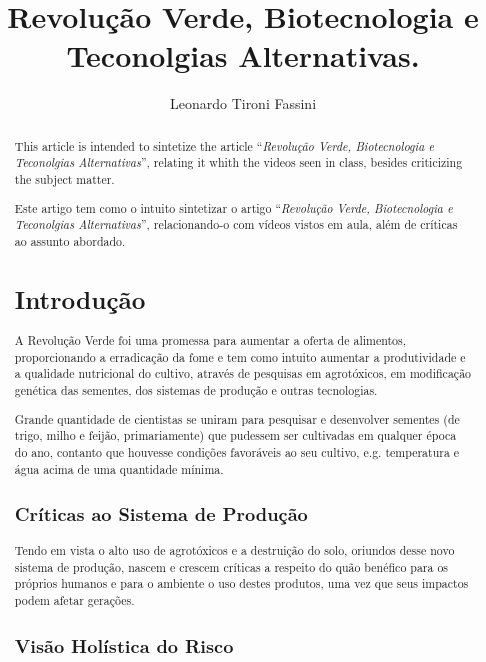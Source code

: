 \documentclass[12pt]{article}
\title{ Revolução Verde, Biotecnologia e Teconolgias Alternativas. }
\author{ Leonardo Tironi Fassini }
\begin{document}
\maketitle

\begin{abstract}
  This article is intended to sintetize the article ``\emph{Revolução Verde, Biotecnologia e Teconolgias Alternativas}''\cite{livro}, relating it whith the videos seen in class, besides criticizing the subject matter.

\begin{resumo}
  Este artigo tem como o intuito sintetizar o artigo ``\emph{Revolução Verde, Biotecnologia e Teconolgias Alternativas}''\cite{livro}, relacionando-o com vídeos vistos em aula, além de críticas ao assunto abordado.
\end{resumo}


\section{ Introdução }

A Revolução Verde foi uma promessa para aumentar a oferta de alimentos, proporcionando a erradicação da fome\cite{albergoni} e tem como intuito aumentar a produtividade e a qualidade nutricional do cultivo, através de pesquisas em agrotóxicos, em modificação genética das sementes, dos sistemas de produção e outras tecnologias\cite{livro}.

Grande quantidade de cientistas se uniram para pesquisar e desenvolver sementes (de trigo, milho e feijão, primariamente) que pudessem ser cultivadas em qualquer época do ano, contanto que houvesse condições favoráveis ao seu cultivo, e.g. temperatura e água acima de uma quantidade mínima.

\subsection{ Críticas ao Sistema de Produção }

Tendo em vista o alto uso de agrotóxicos e a destruição do solo, oriundos desse novo sistema de produção, nascem e crescem críticas a respeito do quão benéfico para os próprios humanos e para o ambiente o uso destes produtos, uma vez que seus impactos podem afetar gerações.

\subsection{ Visão Holística do Risco }


\end{abstract}
\end{document}
